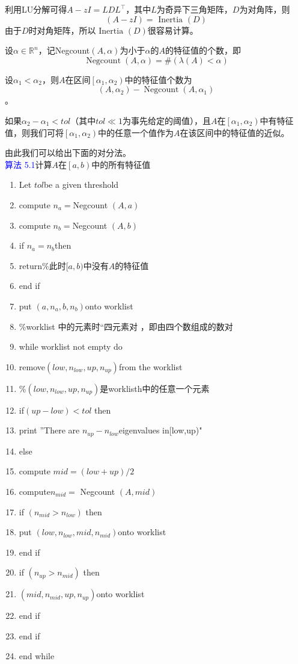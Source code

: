 \documentclass[12pt,a4paper]{article}
\begin{document}
利用LU分解可得$A-z I=L D L^{\top}$，其中$L$为奇异下三角矩阵，$D$为对角阵，则$$
(A-z I)=\text { Inertia }(D)
$$
由于$D$时对角矩阵，所以$\text { Inertia }(D)$很容易计算。

设$\alpha \in \mathbb{R}^{n}$，记Negcount$(A,\alpha)$为小于$\alpha$的$A$的特征值的个数，即$$
\operatorname{Negcount}(A, \alpha)=\#(\lambda(A)<\alpha)
$$

设$\alpha_{1}<\alpha_{2}$，则$A$在区间$\left[\alpha_{1}, \alpha_{2}\right)$中的特征值个数为$$
\left(A, \alpha_{2}\right)-\operatorname{Negcount}\left(A, \alpha_{1}\right)
$$。

如果$\alpha_{2}-\alpha_{1}<t o l$（其中$tol\ll 1$为事先给定的阈值），且$A$在$\left[\alpha_{1}, \alpha_{2}\right)$中有特征值，则我们可将$\left[\alpha_{1}, \alpha_{2}\right)$中的任意一个值作为$A$在该区间中的特征值的近似。

由此我们可以给出下面的对分法。\\
\textcolor{blue}{算法 5.1}\quad 计算$A$在$\left[a, b\right)$中的所有特征值
\begin{enumerate}[1:]
	\item Let $tol$be a given threshold
	\item compute $n_a=$Negcount $(A, a)$
	\item compute $n_b=$Negcount $(A, b)$
	\item if $n_a=n_b$then
	\item \quad return\qquad \%此时$[a,b)$中没有$A$的特征值
	\item end if
	\item put $\left(a, n_{a}, b, n_{b}\right)$onto worklist
	\item \quad \%worklist 中的元素时“四元素对
，即由四个数组成的数对
\item while worklist not empty do
\item \quad remove$\left(l o w, n_{l o w}, u p, n_{u p}\right)$from the worklist
\item \quad \%$\left(l o w, n_{l o w}, u p, n_{u p}\right)$是worklisth中的任意一个元素
\item \quad if$(up-low)<tol$ then
\item \qquad print ”There are $n_{up}-n_{low}$eigenvalues in[low,up)"
\item \quad else
\item \qquad compute $mid=(low+up)/2$
\item \qquad compute$n_{m i d}=$ Negcount $(A, m i d)$
\item \qquad if $\left(n_{m i d}>n_{l o w}\right)$ then
\item \qquad \quad put $\left(l o w, n_{l o w}, m i d, n_{m i d}\right)$onto worklist
\item \qquad end if
\item \qquad if $\left(n_{up}>n_{mid}\right)$ then
\item \qquad \quad $\left(m i d, n_{m i d}, u p, n_{u p}\right)$onto worklist
\item \qquad end if
\item \quad end if
\item end while
\end{enumerate}
\end{document}
